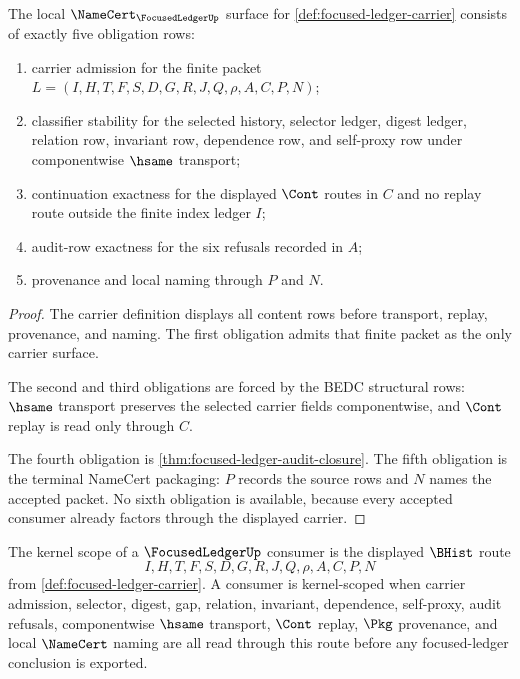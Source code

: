 \begin{theorem}
\label{thm:focused-ledger-namecert-obligation-surface}
The local $\NameCert_{\FocusedLedgerUp}$ surface for \autoref{def:focused-ledger-carrier} consists of exactly five obligation rows:
\begin{enumerate}
\item carrier admission for the finite packet $L=(I,H,T,F,S,D,G,R,J,Q,\rho,A,C,P,N)$;
\item classifier stability for the selected history, selector ledger, digest ledger, relation row, invariant row, dependence row, and self-proxy row under componentwise $\hsame$ transport;
\item continuation exactness for the displayed $\Cont$ routes in $C$ and no replay route outside the finite index ledger $I$;
\item audit-row exactness for the six refusals recorded in $A$;
\item provenance and local naming through $P$ and $N$.
\end{enumerate}
\end{theorem}
\begin{proof}
The carrier definition displays all content rows before transport, replay, provenance, and naming. The first obligation admits that finite packet as the only carrier surface.

The second and third obligations are forced by the BEDC structural rows: $\hsame$ transport preserves the selected carrier fields componentwise, and $\Cont$ replay is read only through $C$.

The fourth obligation is \autoref{thm:focused-ledger-audit-closure}. The fifth obligation is the terminal NameCert packaging: $P$ records the source rows and $N$ names the accepted packet. No sixth obligation is available, because every accepted consumer already factors through the displayed carrier.
\end{proof}

\begin{definition}
\label{def:focused-ledger-kernel-scope}
The kernel scope of a $\FocusedLedgerUp$ consumer is the displayed $\BHist$ route
$$
I,H,T,F,S,D,G,R,J,Q,\rho,A,C,P,N
$$
from \autoref{def:focused-ledger-carrier}. A consumer is kernel-scoped when carrier admission, selector, digest, gap, relation, invariant, dependence, self-proxy, audit refusals, componentwise $\hsame$ transport, $\Cont$ replay, $\Pkg$ provenance, and local $\NameCert$ naming are all read through this route before any focused-ledger conclusion is exported.
\end{definition}

